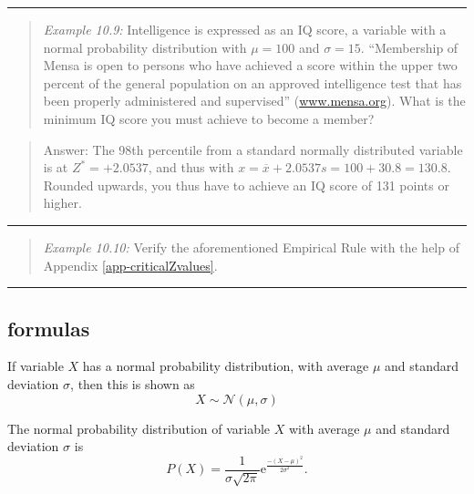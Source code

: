 \documentclass[
]{book}
\begin{document}
\begin{center}\rule{0.5\linewidth}{0.5pt}\end{center}

\begin{quote}
\emph{Example 10.9:}
Intelligence is expressed as an IQ score, a variable with a normal
probability distribution with \(\mu=100\) and \(\sigma=15\). ``Membership of Mensa
is open to persons who have achieved a score within the upper two
percent of the general population on an approved intelligence test that
has been properly administered and supervised''
(\url{www.mensa.org}). What is the minimum IQ score you must
achieve to become a member?
\end{quote}

\begin{quote}
Answer: The 98th percentile from a standard normally distributed
variable is at \(Z^*=+2.0537\), and thus with
\(x=\overline{x}+2.0537 s = 100+30.8 = 130.8\). Rounded upwards, you thus
have to achieve an IQ score of 131 points or higher.
\end{quote}

\begin{center}\rule{0.5\linewidth}{0.5pt}\end{center}

\begin{quote}
\emph{Example 10.10:}
Verify the aforementioned Empirical Rule with the help of
Appendix \ref{app-criticalZvalues}.
\end{quote}

\begin{center}\rule{0.5\linewidth}{0.5pt}\end{center}

\hypertarget{formulas-1}{%
\subsection{formulas}\label{formulas-1}}

If variable \(X\) has a normal probability distribution, with average \(\mu\)
and standard deviation \(\sigma\), then this is shown as
\begin{equation}
  X \sim \mathcal{N}(\mu,\sigma)
  \label{eq:normallydistributed}
\end{equation}

The normal probability distribution of variable \(X\) with average \(\mu\) and
standard deviation \(\sigma\) is
\begin{equation}
  P(X) = \frac{1}{\sigma \sqrt{2\pi}} \mbox{e}^{ \frac{-(X-\mu)^2}{2\sigma^2} }.
  \label{eq:prob-normal}
\end{equation}
\end{document}
